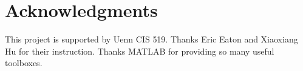 \documentclass{article}
\begin{document}

\section*{Acknowledgments} 
This project is supported by Uenn CIS 519. Thanks Eric Eaton and Xiaoxiang Hu for their instruction. Thanks MATLAB for providing so many useful toolboxes.



\end{document}
